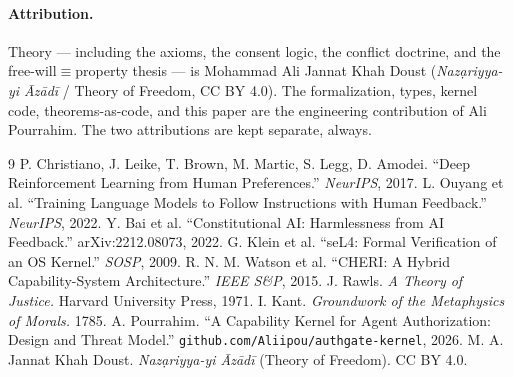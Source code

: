 \documentclass[11pt]{article}
\begin{document}
\paragraph{Attribution.} Theory --- including the axioms, the consent logic, the conflict
doctrine, and the free-will$\equiv$property thesis --- is Mohammad Ali Jannat Khah Doust
(\emph{Naz\d{a}riyya-yi \=Az\=ad\=i} / Theory of Freedom, CC BY 4.0). The formalization, types, kernel code,
theorems-as-code, and this paper are the engineering contribution of Ali Pourrahim. The two
attributions are kept separate, always.

\begin{thebibliography}{9}
 P. Christiano, J. Leike, T. Brown, M. Martic, S. Legg, D. Amodei.
``Deep Reinforcement Learning from Human Preferences.'' \emph{NeurIPS}, 2017.
 L. Ouyang et al. ``Training Language Models to Follow Instructions with
Human Feedback.'' \emph{NeurIPS}, 2022.
 Y. Bai et al. ``Constitutional AI: Harmlessness from AI Feedback.''
arXiv:2212.08073, 2022.
 G. Klein et al. ``seL4: Formal Verification of an OS Kernel.''
\emph{SOSP}, 2009.
 R. N. M. Watson et al. ``CHERI: A Hybrid Capability-System
Architecture.'' \emph{IEEE S\&P}, 2015.
 J. Rawls. \emph{A Theory of Justice.} Harvard University Press, 1971.
 I. Kant. \emph{Groundwork of the Metaphysics of Morals.} 1785.
 A. Pourrahim. ``A Capability Kernel for Agent Authorization: Design and
Threat Model.'' \texttt{github.com/Aliipou/authgate-kernel}, 2026.
 M. A. Jannat Khah Doust. \emph{Naz\d{a}riyya-yi \=Az\=ad\=i}
(Theory of Freedom). CC BY 4.0.
\end{thebibliography}
\end{document}
